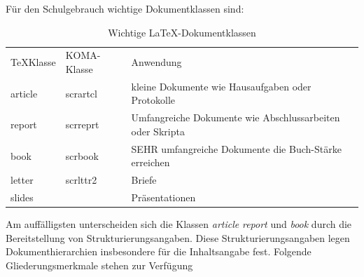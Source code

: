 Für den Schulgebrauch wichtige Dokumentklassen sind: 
\begin {table} [ht]
\begin{tabular}{p{20mm}p{25mm}p{100mm}}
	\TeX Klasse & KOMA-Klasse 	& Anwendung\\
	article 	& scrartcl		& kleine Dokumente wie Hausaufgaben oder Protokolle\\ 
	report		& scrreprt		& Umfangreiche Dokumente wie Abschlussarbeiten oder Skripta\\
	book		& scrbook		& SEHR umfangreiche Dokumente die Buch-Stärke erreichen\\
	letter		& scrlttr2		& Briefe\\
	slides		&				& Präsentationen\\
	
\end{tabular}
\caption {Wichtige \LaTeX -Dokumentklassen}
\end {table}
\FloatBarrier
Am auffälligsten unterscheiden sich die Klassen \emph{article} \emph{report} und \emph{book} durch die Bereitstellung von Strukturierungsangaben.
Diese Strukturierungsangaben legen Dokumenthierarchien insbesondere für die Inhaltsangabe fest.
Folgende Gliederungsmerkmale stehen zur Verfügung
